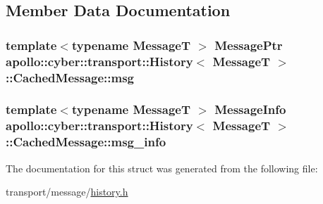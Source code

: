 \subsection{Member Data Documentation}
\hypertarget{structapollo_1_1cyber_1_1transport_1_1History_1_1CachedMessage_a48a1ca0f2407b79c69fc63f3ad5fbd46}{
\subsubsection[{msg}]{\setlength{\rightskip}{0pt plus 5cm}template$<$typename Message\-T $>$ {\bf Message\-Ptr} {\bf apollo\-::cyber\-::transport\-::\-History}$<$ Message\-T $>$\-::Cached\-Message\-::msg}}\label{structapollo_1_1cyber_1_1transport_1_1History_1_1CachedMessage_a48a1ca0f2407b79c69fc63f3ad5fbd46}
\hypertarget{structapollo_1_1cyber_1_1transport_1_1History_1_1CachedMessage_a42ec71985e1d8e8bd86ea77232301278}{
\subsubsection[{msg\-\_\-info}]{\setlength{\rightskip}{0pt plus 5cm}template$<$typename Message\-T $>$ {\bf Message\-Info} {\bf apollo\-::cyber\-::transport\-::\-History}$<$ Message\-T $>$\-::Cached\-Message\-::msg\-\_\-info}}\label{structapollo_1_1cyber_1_1transport_1_1History_1_1CachedMessage_a42ec71985e1d8e8bd86ea77232301278}


The documentation for this struct was generated from the following file\-:\begin{DoxyCompactItemize}
\item 
transport/message/\hyperlink{history_8h}{history.\-h}\end{DoxyCompactItemize}
